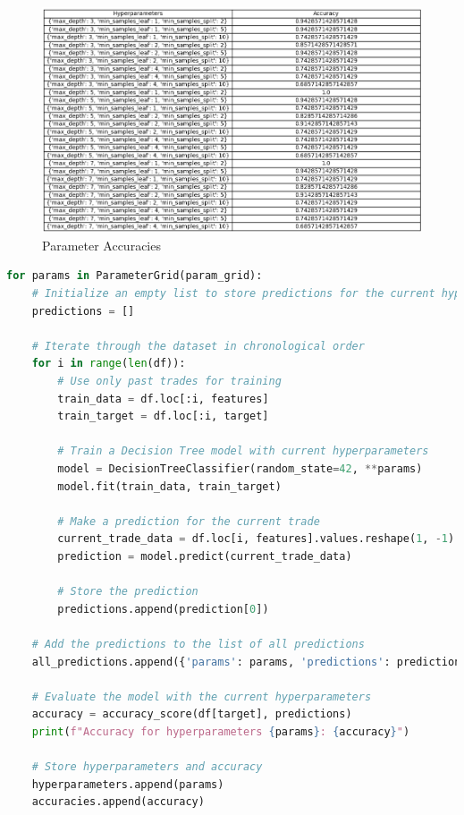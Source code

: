 \documentclass{article}
\begin{document}
\begin{figure}
    \centering
    \includegraphics[width=1\linewidth]{param_accuracy_table.png}
    \caption{Parameter Accuracies}
    \label{fig:enter-label}
\end{figure}

\begin{lstlisting}[language=Python, caption={Testing Parameters}, label={lst:python}]
for params in ParameterGrid(param_grid):
    # Initialize an empty list to store predictions for the current hyperparameters
    predictions = []

    # Iterate through the dataset in chronological order
    for i in range(len(df)):
        # Use only past trades for training
        train_data = df.loc[:i, features]
        train_target = df.loc[:i, target]

        # Train a Decision Tree model with current hyperparameters
        model = DecisionTreeClassifier(random_state=42, **params)
        model.fit(train_data, train_target)

        # Make a prediction for the current trade
        current_trade_data = df.loc[i, features].values.reshape(1, -1)
        prediction = model.predict(current_trade_data)

        # Store the prediction
        predictions.append(prediction[0])

    # Add the predictions to the list of all predictions
    all_predictions.append({'params': params, 'predictions': predictions})

    # Evaluate the model with the current hyperparameters
    accuracy = accuracy_score(df[target], predictions)
    print(f"Accuracy for hyperparameters {params}: {accuracy}")

    # Store hyperparameters and accuracy
    hyperparameters.append(params)
    accuracies.append(accuracy)
\end{lstlisting}
\end{document}
